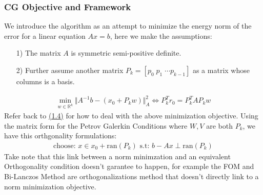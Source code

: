 \documentclass[]{article}
\theoremstyle{definition}
\begin{document}
        \subsubsection{CG Objective and Framework}
            We introduce the algorithm as an attempt to minimize the energy norm of the error for a linear equation $Ax = b$, here we make the assumptions: 
            \begin{itemize}
                \item [1)] The matrix $A$ is symmetric semi-positive definite.  
                \item [2)] Further assume another matrix $P_k = [p_0 \;p_1\;\cdots p_{k-1}]$ as a matrix whose columns is a basis.
            \end{itemize}
            \begin{align}
                \min_{w \in \mathbb{R}^k}\Vert 
                    A^{-1}b - (x_0 + P_kw)
                \Vert_A^2 \iff P^T_kr_0 = P_k^TAP_kw
            \end{align}
            Refer back to \hyperref[sec:1.4]{(1.4)} for how to deal with the above minimization objective. Using the matrix form for the Petrov Galerkin Conditions where $W, V$ are both $P_k$, we have this orthgonality formulations: 
            \begin{align}
                \text{choose: }x \in x_0 + \text{ran}(P_k) \text{ s.t: } b - Ax \perp \text{ran}(P_k)    
            \end{align}
            Take note that this link between a norm minimzation and an equivalent Orthogonality condition doesn't garantee to happen, for example the FOM and Bi-Lanczos Method are orthogonalizations method that doesn't directly link to a norm minimization objective. 
\end{document}
